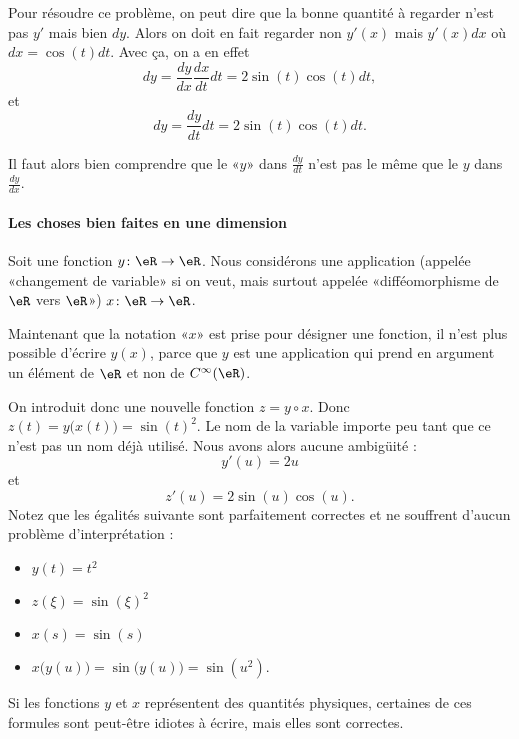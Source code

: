     Pour résoudre ce problème, on peut dire que la bonne quantité à regarder n'est pas \( y'\) mais bien \( dy\). Alors on doit en fait regarder non \( y'(x)\) mais \( y'(x)dx\) où \( dx=\cos(t)dt\). Avec ça, on a en effet
    \begin{equation}
        dy=\frac{ dy }{ dx }\frac{ dx }{ dt }dt=2\sin(t)\cos(t)dt,
    \end{equation}
    et
    \begin{equation}
        dy=\frac{ dy }{ dt }dt=2\sin(t)\cos(t)dt.
    \end{equation}
    
    Il faut alors bien comprendre que le «\( y\)» dans \( \frac{ dy }{ dt }\) n'est pas le même que le \( y\) dans \( \frac{ dy }{ dx }\).

\paragraph{Les choses bien faites en une dimension}

Soit une fonction \( y\colon \eR\to \eR\). Nous considérons une application (appelée «changement de variable» si on veut, mais surtout appelée «difféomorphisme de \( \eR\) vers $\eR$») \( x\colon \eR\to \eR\).

Maintenant que la notation «\( x\)» est prise pour désigner une fonction, il n'est plus possible d'écrire \( y(x)\), parce que \( y\) est une application qui prend en argument un élément de \( \eR\) et non de \(  C^{\infty}(\eR)\).

On introduit donc une nouvelle fonction \( z=y\circ x\). Donc \( z(t)=y\big( x(t) \big)=\sin(t)^2\). Le nom de la variable importe peu tant que ce n'est pas un nom déjà utilisé. Nous avons alors aucune ambigüité :
\begin{equation}
    y'(u)=2u
\end{equation}
et
\begin{equation}
    z'(u)=2\sin(u)\cos(u).
\end{equation}
Notez que les égalités suivante sont parfaitement correctes et ne souffrent d'aucun problème d'interprétation :
\begin{itemize}
    \item 
        \( y(t)=t^2\) 
    \item
        \( z(\xi)=\sin(\xi)^2\)
    \item
        \( x(s)=\sin(s)\)
    \item
        \( x\big( y(u) \big)=\sin\big( y(u) \big)=\sin(u^2)\).
\end{itemize}
    Si les fonctions \( y\) et \( x\) représentent des quantités physiques, certaines de ces formules sont peut-être idiotes à écrire, mais elles sont correctes.

